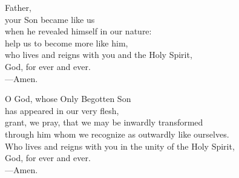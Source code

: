 \prayer

\begin{prayerverse}

Father,\\
your Son became like us\\
when he revealed himself in our nature:\\
help us to become more like him,\\
who lives and reigns with you and the Holy Spirit,\\
God, for ever and ever.\\
{\color{red}---\thinspace}Amen.

\end{prayerverse}


\begin{prayerverse}

O God, whose Only Begotten Son\\
has appeared in our very flesh,\\
grant, we pray, that we may be inwardly transformed\\
through him whom we recognize as outwardly like ourselves.\\
Who lives and reigns with you in the unity of the Holy Spirit,\\
God, for ever and ever.\\
{\color{red}---\thinspace}Amen.

\end{prayerverse}